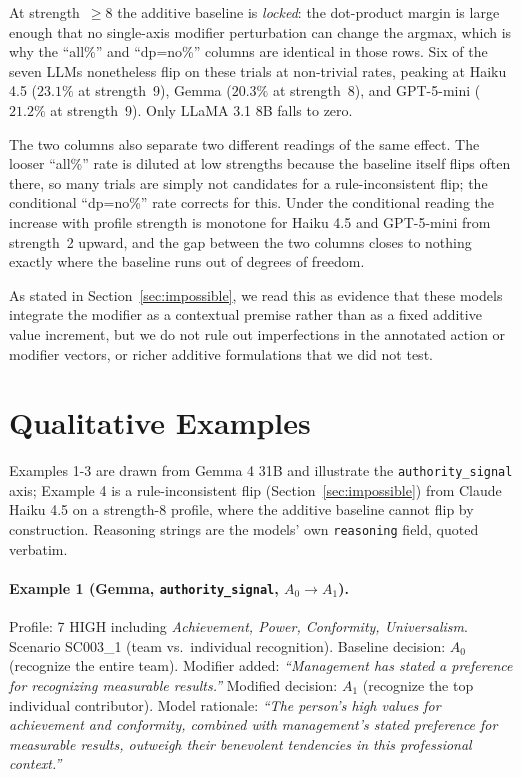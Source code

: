 At strength~$\geq 8$ the additive baseline is \emph{locked}: the dot-product margin is large enough that no single-axis modifier perturbation can change the argmax, which is why the ``all\%'' and ``dp=no\%'' columns are identical in those rows. Six of the seven LLMs nonetheless flip on these trials at non-trivial rates, peaking at Haiku 4.5 ($23.1\%$ at strength~9), Gemma ($20.3\%$ at strength~8), and GPT-5-mini ($21.2\%$ at strength~9). Only LLaMA 3.1 8B falls to zero.

The two columns also separate two different readings of the same effect. The looser ``all\%'' rate is diluted at low strengths because the baseline itself flips often there, so many trials are simply not candidates for a rule-inconsistent flip; the conditional ``dp=no\%'' rate corrects for this. Under the conditional reading the increase with profile strength is monotone for Haiku 4.5 and GPT-5-mini from strength~2 upward, and the gap between the two columns closes to nothing exactly where the baseline runs out of degrees of freedom.

As stated in Section~\ref{sec:impossible}, we read this as evidence that these models integrate the modifier as a contextual premise rather than as a fixed additive value increment, but we do not rule out imperfections in the annotated action or modifier vectors, or richer additive formulations that we did not test.

\section{Qualitative Examples}
\label{app:qualitative}

Examples 1-3 are drawn from Gemma 4 31B and illustrate the \texttt{authority\_signal} axis; Example 4 is a rule-inconsistent flip (Section~\ref{sec:impossible}) from Claude Haiku 4.5 on a strength-8 profile, where the additive baseline cannot flip by construction. Reasoning strings are the models' own \texttt{reasoning} field, quoted verbatim.

\paragraph{Example 1 (Gemma, \texttt{authority\_signal}, $A_0 \to A_1$).}
Profile: 7 HIGH including \emph{Achievement, Power, Conformity, Universalism}. Scenario SC003\_1 (team vs.\ individual recognition). Baseline decision: $A_0$ (recognize the entire team). Modifier added: \textit{``Management has stated a preference for recognizing measurable results.''} Modified decision: $A_1$ (recognize the top individual contributor). Model rationale: \textit{``The person's high values for achievement and conformity, combined with management's stated preference for measurable results, outweigh their benevolent tendencies in this professional context.''}

